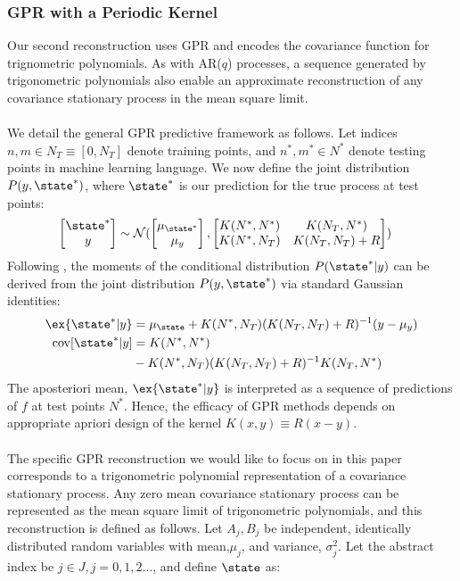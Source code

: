\subsubsection{GPR with a Periodic Kernel}

Our second reconstruction uses GPR and encodes the covariance function for trignometric polynomials. As with AR($q$) processes, a sequence generated by trigonometric polynomials also enable an approximate reconstruction of any covariance stationary process in the mean square limit.
\\
\\
We detail the general GPR predictive framework as follows. Let indices $n,m \in N_T \equiv [0, N_T]$ denote training points, and $n^*,m^* \in N^*$ denote testing points in machine learning language. We now define the joint distribution $P(y,\state^*)$, where $\state^*$ is our prediction for the true process at test points: 
\begin{align}
\begin{bmatrix} \state^* \\y \end{bmatrix} & \sim \mathcal{N} (\begin{bmatrix} \mu_{\state^*} \\ \mu_y
\end{bmatrix} , \begin{bmatrix}   K(N^*,N^*)&K(N_T,N^*) \\ K(N^*,N_T) & K(N_T,N_T) + R \end{bmatrix} )
\end{align}
Following \cite{rasmussen2006}, the moments of the conditional distribution $P(\state^*|y)$ can be derived from the joint distribution $P(y,\state^*)$ via standard Gaussian identities:
\begin{align}
\ex{\state^*|y} &= \mu_\state + K(N^*,N_T)(K(N_T,N_T) + R )^{-1} (y - \mu_y) \\
\text{cov}[\state^*|y] &= K(N^*,N^*) \nonumber \\
& - K(N^*,N_T)(K(N_T, N_T) + R)^{-1}K(N_T,N^*) 
\end{align}
The aposteriori mean, $\ex{\state^*|y}$ is interpreted as a sequence of predictions of $f$ at test points $N^*$. Hence, the efficacy of GPR methods depends on appropriate apriori design of the kernel $K(x,y) \equiv R(x-y)$. 
\\
\\
The specific GPR reconstruction we would like to focus on in this paper corresponds to a trigonometric polynomial representation of a covariance stationary process. Any zero mean covariance stationary process can be represented as the mean square limit of trigonometric polynomials, and this reconstruction is defined as follows. Let $A_j, B_j$ be independent, identically distributed random variables with mean,$\mu_j$, and variance, $\sigma_j^2$. Let the abstract index be $j \in J, j = 0,1,2... $, and define $\state$ as:
